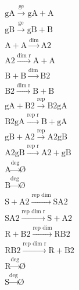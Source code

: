 $$
\begin{array}{cccc}
      \textrm{gA}\stackrel{\textrm{ge}}{\longrightarrow}\textrm{gA} + \textrm{A} \\
      \textrm{gB}\stackrel{\textrm{ge}}{\longrightarrow}\textrm{gB} + \textrm{B} \\
      \textrm{A} + \textrm{A} \stackrel{\textrm{dim}}{\longrightarrow}\textrm{A2} \\
      \textrm{A2} \stackrel{\textrm{dim r}}{\longrightarrow}\textrm{A} + \textrm{A} \\
      \textrm{B} + \textrm{B} \stackrel{\textrm{dim}}{\longrightarrow} \textrm{B2} \\
      \textrm{B2} \stackrel{\textrm{dim r}}{\longrightarrow}\textrm{B} + \textrm{B} \\
      \textrm{gA} + \textrm{B2} \stackrel{\textrm{rep}}{\longrightarrow}\textrm{B2gA} \\
      \textrm{B2gA} \stackrel{\textrm{rep r}}{\longrightarrow}\textrm{B} + \textrm{gA} \\
      \textrm{gB} + \textrm{A2} \stackrel{\textrm{rep}}{\longrightarrow}\textrm{A2gB} \\
      \textrm{A2gB} \stackrel{\textrm{rep r}}{\longrightarrow}\textrm{A2} + \textrm{gB} \\
      \textrm{A} \stackrel{\textrm{deg}}{\longrightarrow}\textrm{\O}\\
      \textrm{B} \stackrel{\textrm{deg}}{\longrightarrow}\textrm{\O}\\
      \textrm{S} + \textrm{A2} \stackrel{\textrm{rep dim}}{\longrightarrow}\textrm{SA2}\\
      \textrm{SA2} \stackrel{\textrm{rep dim r}}{\longrightarrow}\textrm{S} + \textrm{A2}\\
      \textrm{R} + \textrm{B2} \stackrel{\textrm{rep dim}}{\longrightarrow}\textrm{RB2}\\
      \textrm{RB2} \stackrel{\textrm{rep dim r}}{\longrightarrow}\textrm{R} + \textrm{B2}\\
      \textrm{R} \stackrel{\textrm{deg}}{\longrightarrow} \textrm{\O}\\
      \textrm{S} \stackrel{\textrm{deg}}{\longrightarrow}\textrm{\O}\\
\end{array}
$$
